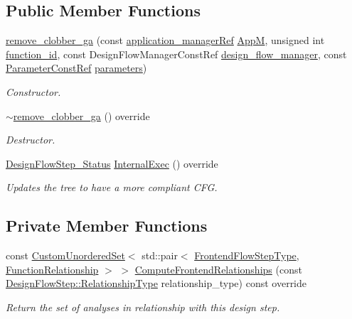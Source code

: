 \subsection*{Public Member Functions}
\begin{DoxyCompactItemize}
\item 
\hyperlink{classremove__clobber__ga_a0cb33caf4a52b3b9437463533669f1c1}{remove\+\_\+clobber\+\_\+ga} (const \hyperlink{application__manager_8hpp_a04ccad4e5ee401e8934306672082c180}{application\+\_\+manager\+Ref} \hyperlink{classFrontendFlowStep_a0ac0d8db2a378416583f51c4faa59d15}{AppM}, unsigned int \hyperlink{classFunctionFrontendFlowStep_a58ef2383ad1a212a8d3f396625a4b616}{function\+\_\+id}, const Design\+Flow\+Manager\+Const\+Ref \hyperlink{classDesignFlowStep_ab770677ddf087613add30024e16a5554}{design\+\_\+flow\+\_\+manager}, const \hyperlink{Parameter_8hpp_a37841774a6fcb479b597fdf8955eb4ea}{Parameter\+Const\+Ref} \hyperlink{classDesignFlowStep_a802eaafe8013df706370679d1a436949}{parameters})
\begin{DoxyCompactList}\small\item\em Constructor. \end{DoxyCompactList}\item 
\hyperlink{classremove__clobber__ga_a146625e689771f55b70d2334e4faef95}{$\sim$remove\+\_\+clobber\+\_\+ga} () override
\begin{DoxyCompactList}\small\item\em Destructor. \end{DoxyCompactList}\item 
\hyperlink{design__flow__step_8hpp_afb1f0d73069c26076b8d31dbc8ebecdf}{Design\+Flow\+Step\+\_\+\+Status} \hyperlink{classremove__clobber__ga_abea85b05a86d42b44170ab4919ac2476}{Internal\+Exec} () override
\begin{DoxyCompactList}\small\item\em Updates the tree to have a more compliant C\+FG. \end{DoxyCompactList}\end{DoxyCompactItemize}
\subsection*{Private Member Functions}
\begin{DoxyCompactItemize}
\item 
const \hyperlink{classCustomUnorderedSet}{Custom\+Unordered\+Set}$<$ std\+::pair$<$ \hyperlink{frontend__flow__step_8hpp_afeb3716c693d2b2e4ed3e6d04c3b63bb}{Frontend\+Flow\+Step\+Type}, \hyperlink{classFrontendFlowStep_af7cf30f2023e5b99e637dc2058289ab0}{Function\+Relationship} $>$ $>$ \hyperlink{classremove__clobber__ga_a59b83e5d015d246d811dfc4e26928897}{Compute\+Frontend\+Relationships} (const \hyperlink{classDesignFlowStep_a723a3baf19ff2ceb77bc13e099d0b1b7}{Design\+Flow\+Step\+::\+Relationship\+Type} relationship\+\_\+type) const override
\begin{DoxyCompactList}\small\item\em Return the set of analyses in relationship with this design step. \end{DoxyCompactList}\end{DoxyCompactItemize}
